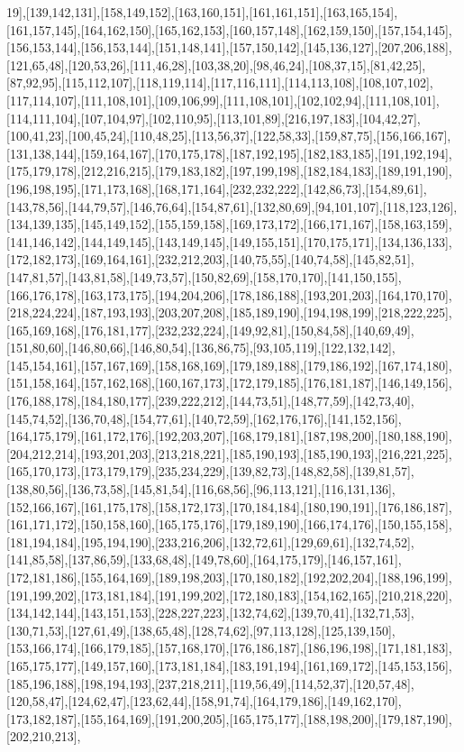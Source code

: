 19],[139,142,131],[158,149,152],[163,160,151],[161,161,151],[163,165,154],[161,157,145],[164,162,150],[165,162,153],[160,157,148],[162,159,150],[157,154,145],[156,153,144],[156,153,144],[151,148,141],[157,150,142],[145,136,127],[207,206,188],[121,65,48],[120,53,26],[111,46,28],[103,38,20],[98,46,24],[108,37,15],[81,42,25],[87,92,95],[115,112,107],[118,119,114],[117,116,111],[114,113,108],[108,107,102],[117,114,107],[111,108,101],[109,106,99],[111,108,101],[102,102,94],[111,108,101],[114,111,104],[107,104,97],[102,110,95],[113,101,89],[216,197,183],[104,42,27],[100,41,23],[100,45,24],[110,48,25],[113,56,37],[122,58,33],[159,87,75],[156,166,167],[131,138,144],[159,164,167],[170,175,178],[187,192,195],[182,183,185],[191,192,194],[175,179,178],[212,216,215],[179,183,182],[197,199,198],[182,184,183],[189,191,190],[196,198,195],[171,173,168],[168,171,164],[232,232,222],[142,86,73],[154,89,61],[143,78,56],[144,79,57],[146,76,64],[154,87,61],[132,80,69],[94,101,107],[118,123,126],[134,139,135],[145,149,152],[155,159,158],[169,173,172],[166,171,167],[158,163,159],[141,146,142],[144,149,145],[143,149,145],[149,155,151],[170,175,171],[134,136,133],[172,182,173],[169,164,161],[232,212,203],[140,75,55],[140,74,58],[145,82,51],[147,81,57],[143,81,58],[149,73,57],[150,82,69],[158,170,170],[141,150,155],[166,176,178],[163,173,175],[194,204,206],[178,186,188],[193,201,203],[164,170,170],[218,224,224],[187,193,193],[203,207,208],[185,189,190],[194,198,199],[218,222,225],[165,169,168],[176,181,177],[232,232,224],[149,92,81],[150,84,58],[140,69,49],[151,80,60],[146,80,66],[146,80,54],[136,86,75],[93,105,119],[122,132,142],[145,154,161],[157,167,169],[158,168,169],[179,189,188],[179,186,192],[167,174,180],[151,158,164],[157,162,168],[160,167,173],[172,179,185],[176,181,187],[146,149,156],[176,188,178],[184,180,177],[239,222,212],[144,73,51],[148,77,59],[142,73,40],[145,74,52],[136,70,48],[154,77,61],[140,72,59],[162,176,176],[141,152,156],[164,175,179],[161,172,176],[192,203,207],[168,179,181],[187,198,200],[180,188,190],[204,212,214],[193,201,203],[213,218,221],[185,190,193],[185,190,193],[216,221,225],[165,170,173],[173,179,179],[235,234,229],[139,82,73],[148,82,58],[139,81,57],[138,80,56],[136,73,58],[145,81,54],[116,68,56],[96,113,121],[116,131,136],[152,166,167],[161,175,178],[158,172,173],[170,184,184],[180,190,191],[176,186,187],[161,171,172],[150,158,160],[165,175,176],[179,189,190],[166,174,176],[150,155,158],[181,194,184],[195,194,190],[233,216,206],[132,72,61],[129,69,61],[132,74,52],[141,85,58],[137,86,59],[133,68,48],[149,78,60],[164,175,179],[146,157,161],[172,181,186],[155,164,169],[189,198,203],[170,180,182],[192,202,204],[188,196,199],[191,199,202],[173,181,184],[191,199,202],[172,180,183],[154,162,165],[210,218,220],[134,142,144],[143,151,153],[228,227,223],[132,74,62],[139,70,41],[132,71,53],[130,71,53],[127,61,49],[138,65,48],[128,74,62],[97,113,128],[125,139,150],[153,166,174],[166,179,185],[157,168,170],[176,186,187],[186,196,198],[171,181,183],[165,175,177],[149,157,160],[173,181,184],[183,191,194],[161,169,172],[145,153,156],[185,196,188],[198,194,193],[237,218,211],[119,56,49],[114,52,37],[120,57,48],[120,58,47],[124,62,47],[123,62,44],[158,91,74],[164,179,186],[149,162,170],[173,182,187],[155,164,169],[191,200,205],[165,175,177],[188,198,200],[179,187,190],[202,210,213],